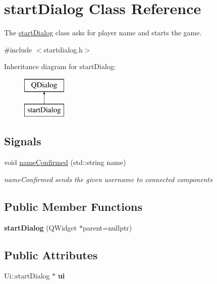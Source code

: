 \hypertarget{classstart_dialog}{\section{start\-Dialog Class Reference}
\label{classstart_dialog}
}


The \hyperlink{classstart_dialog}{start\-Dialog} class asks for player name and starts the game.  




{\ttfamily \#include $<$startdialog.\-h$>$}

Inheritance diagram for start\-Dialog\-:\begin{figure}[H]
\begin{center}
\leavevmode
\includegraphics[height=2.000000cm]{classstart_dialog}
\end{center}
\end{figure}
\subsection*{Signals}
\begin{DoxyCompactItemize}
\item 
void \hyperlink{classstart_dialog_a2266e2fa74c0a89fb52cf37838dec5cb}{name\-Confirmed} (std\-::string name)
\begin{DoxyCompactList}\small\item\em name\-Confirmed sends the given username to connected components \end{DoxyCompactList}\end{DoxyCompactItemize}
\subsection*{Public Member Functions}
\begin{DoxyCompactItemize}
\item 
\hypertarget{classstart_dialog_af96dc2ef29556c30a70e575703e09e1c}{{\bfseries start\-Dialog} (Q\-Widget $\ast$parent=nullptr)}\label{classstart_dialog_af96dc2ef29556c30a70e575703e09e1c}

\end{DoxyCompactItemize}
\subsection*{Public Attributes}
\begin{DoxyCompactItemize}
\item 
\hypertarget{classstart_dialog_a0e815d8d32048d4f87483b70a6596021}{Ui\-::start\-Dialog $\ast$ {\bfseries ui}}\label{classstart_dialog_a0e815d8d32048d4f87483b70a6596021}

\end{DoxyCompactItemize}


